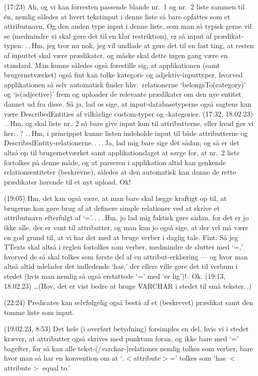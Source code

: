 \documentclass{report}
\begin{document}
(17:23) Ah, og vi kan forresten passende blande nr.\ 1 og nr.\ 2 liste sammen til én, nemlig således at hvert tekstinput i denne liste så bare opfattes som et attributnavn. Og den anden type input i denne liste, som man så typisk gerne vil se (medmindre vi skal gøre det til en klar restriktion), er så input af prædikat-typen. .\,.\,Hm, jeg tror nu nok, jeg vil undlade at gøre det til en fast ting, at resten af inputtet skal være prædikater, og måske skal dette ingen gang være en standard. Man kunne således også forestille sig, at applikationen (samt brugernetværket) også fint kan tolke kategori- og adjektiv-inputtyper, hvorved applikationen så selv automatisk finder hhv.\ relationerne `belongsTo(category)' og `is(adjective)' frem og uploader de relevante prædikater om den nye entitet dannet ud fra disse. Så ja, lad os sige, at input-databasetyperne også sagtens kan være DescribedEntities af vilkårlige custom-typer og -kategorier. (17:32, 18.02.23) .\,.\,Hm, og skal liste nr.\ 2 så bare give input kun til attributterne, eller hvad gør vi her.\,.\,? .\,.\,Hm, i princippet kunne listen indeholde input til både attributterne og DescribedEntity-relationerne.\,. .\,.\,Ja, lad mig bare sige det sådan, og så er det altså op til brugernetværket samt applikationslaget at sørge for, at nr.\ 2 liste fortolkes på denne måde, og at parseren i applikation altid kan genkende relationsentiteter (beskrevne), således at den automatisk kan danne de rette prædikater hørende til et nyt upload. Ok! 

(19:05) Hm, det kan også være, at man bare skal lægge kraftigt op til, at brugerne kan gøre brug af at definere simple relationer ved at skrive et attributnavn efterfulgt af `='.\,. .\,.\,Hm, jo lad mig faktisk gøre sådan, for det er jo ikke alle, der er vant til attributter, og man kan jo også sige, at der vel må være en god grund til, at vi har det med at bruge verber i daglig tale. Fint. Så jeg TTexts skal altså i reglen fortolkes som verber, medmindre de slutter med `=,' hvorved de så skal tolkes som første del af en attribut-erklæring --- og hvor man altså altid udelader det indledende `has,' der ellers ville gøre det til verbum i stedet (hvis man nemlig så også erstattede `=' med `er lig')!\,. Ok. (19:13, 18.02.23) \ldots (Hov, det er vist bedre at bruge VARCHAR i stedet til små tekster.\,.)

(22:24) Predicates kan selvfølgelig også bestå af et (beskrevet) prædikat samt den tomme liste som input. 

(19.02.23, 8:53) Det hele (i overført betydning) forsimples en del, hvis vi i stedet kræver, at attributter også skrives med punktum foran, og ikke bare med `=' bagefter, for så kan alle tekst-(/varchar-)relationer nemlig tolkes som verber, bare hvor man så har en konvention om at `$.<$attribute$>$=' tolkes som `has $<$attribute$>$ equal to.' 
\end{document}
